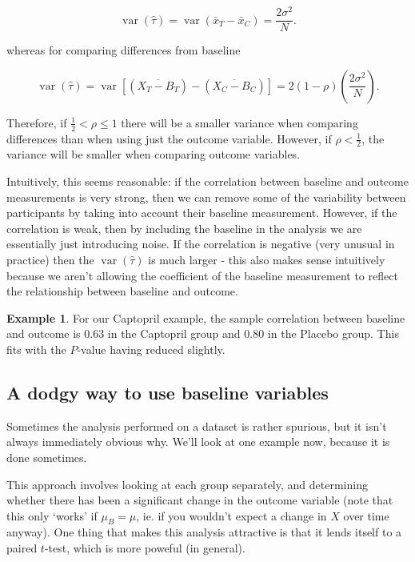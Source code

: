 \documentclass[
  openany]{book}
\theoremstyle{definition}
\theoremstyle{definition}
\newtheorem{example}{Example}[chapter]
\theoremstyle{definition}
\theoremstyle{definition}
\theoremstyle{remark}
\begin{document}
\[\operatorname{var}\left(\hat{\tau}\right) = \operatorname{var}\left(\bar{x}_T - \bar{x}_C\right) = \frac{2\sigma^2}{N}.\]

whereas for comparing differences from baseline

\[\operatorname{var}\left(\hat{\tau}\right) = \operatorname{var}\left[\left(\overline{X_T-B_T}\right) - \left(\overline{X_C - B_C}\right)\right] = 2\left(1-\rho\right)\left(\frac{2\sigma^2}{N}\right).\]

Therefore, if \(\frac{1}{2}<\rho\leq 1\) there will be a smaller variance when comparing differences than when using just the outcome variable. However, if \(\rho<\frac{1}{2}\), the variance will be smaller when comparing outcome variables.

Intuitively, this seems reasonable: if the correlation between baseline and outcome measurements is very strong, then we can remove some of the variability between participants by taking into account their baseline measurement. However, if the correlation is weak, then by including the baseline in the analysis we are essentially just introducing noise. If the correlation is negative (very unusual in practice) then the \(\operatorname{var}\left(\hat\tau\right)\) is much larger - this also makes sense intuitively because we aren't allowing the coefficient of the baseline measurement to reflect the relationship between baseline and outcome.

\begin{example}
For our Captopril example, the sample correlation between baseline and outcome is 0.63 in the Captopril group and 0.80 in the Placebo group. This fits with the \(P\)-value having reduced slightly.
\end{example}

\subsection{A dodgy way to use baseline variables}\label{a-dodgy-way-to-use-baseline-variables}

Sometimes the analysis performed on a dataset is rather spurious, but it isn't always immediately obvious why. We'll look at one example now, because it is done sometimes.

This approach involves looking at each group separately, and determining whether there has been a significant change in the outcome variable (note that this only `works' if \(\mu_B = \mu\), ie. if you wouldn't expect a change in \(X\) over time anyway). One thing that makes this analysis attractive is that it lends itself to a paired \(t\)-test, which is more poweful (in general).
\end{document}
